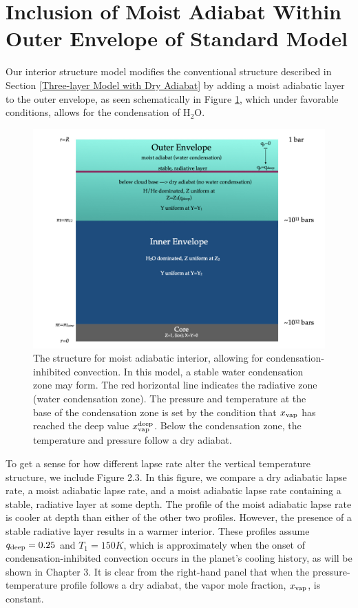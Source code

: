 \documentclass[11pt]{ucscthesisbs}
\begin{document}
\section{Inclusion of Moist Adiabat Within Outer Envelope of Standard Model}
Our interior structure model modifies the conventional structure described in Section \ref{Three-layer Model with Dry Adiabat} by adding a moist adiabatic layer to the outer envelope, as seen schematically in Figure \ref{fig:moist_interior}, which under favorable conditions, allows for the condensation of H$_{2}$O. 
\begin{figure}[ht!]
 \centerline{
  \includegraphics[width=6.0in]{figures/structure_schematic/structure_schematic.002.jpeg}
 }
\caption[Interior Structure for Moist Adiabat]
{The structure for moist adiabatic interior, allowing for condensation-inhibited convection. In this model, a stable water condensation zone may form. The red horizontal line indicates the radiative zone (water condensation zone). The pressure and temperature at the base of the condensation zone is set by the condition that $x_{\rm vap}$ has reached the deep value $x_{\rm vap}^{\rm deep}$. Below the condensation zone, the temperature and pressure follow a dry adiabat.}
\label{fig:moist_interior}
\end{figure}

To get a sense for how different lapse rate alter the vertical temperature structure, we include Figure 2.3. In this figure, we compare a dry adiabatic lapse rate, a moist adiabatic lapse rate, and a moist adiabatic lapse rate containing a stable, radiative layer at some depth. The profile of the moist adiabatic lapse rate is cooler at depth than either of the other two profiles. However, the presence of a stable radiative layer results in a warmer interior. These profiles assume $q_{\rm deep} = 0.25$ and $T_{1} = 150K$, which is approximately when the onset of condensation-inhibited convection occurs in the planet's cooling history, as will be shown in Chapter 3. It is clear from the right-hand panel that when the pressure-temperature profile follows a dry adiabat, the vapor mole fraction, $x_{\rm vap}$, is constant.
\end{document}
